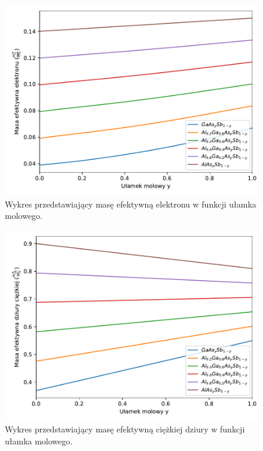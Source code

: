 \documentclass[12pt,openany,a4paper]{book}
\begin{document}
\begin{figure}[H]
	\centering
	\includegraphics[width = 0.9\linewidth]{Figures/quaternary/quat_m_e_x.pdf}
	\caption{Wykres przedstawiający masę efektywną elektronu w funkcji ułamka 
	molowego.}\label{fig:quat_me_x}
\end{figure}

\begin{figure}[H]
	\centering
	\includegraphics[width = 0.9\linewidth]{Figures/quaternary/quat_m_hh_x.pdf}
	\caption{Wykres przedstawiający masę efektywną ciężkiej dziury w funkcji ułamka 
	molowego.}\label{fig:quat_mhh_x}
\end{figure}
\end{document}
